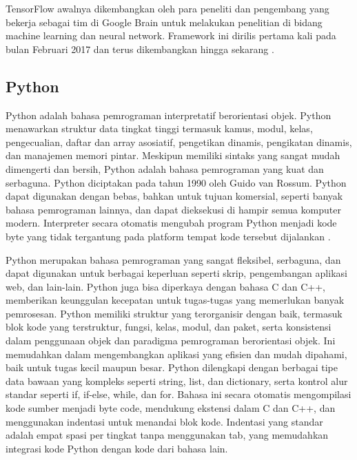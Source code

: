 TensorFlow awalnya dikembangkan oleh para peneliti dan pengembang yang bekerja sebagai tim di Google Brain untuk melakukan penelitian di bidang machine learning dan neural network. Framework ini dirilis pertama kali pada bulan Februari 2017 dan terus dikembangkan hingga sekarang \parencite{Developers}.

\subsection{Python}
Python adalah bahasa pemrograman interpretatif berorientasi objek. Python menawarkan struktur data tingkat tinggi termasuk kamus, modul, kelas, pengecualian, daftar dan array asosiatif, pengetikan dinamis, pengikatan dinamis, dan manajemen memori pintar. Meskipun memiliki sintaks yang sangat mudah dimengerti dan bersih, Python adalah bahasa pemrograman yang kuat dan serbaguna. Python diciptakan pada tahun 1990 oleh Guido van Rossum. Python dapat digunakan dengan bebas, bahkan untuk tujuan komersial, seperti banyak bahasa pemrograman lainnya, dan dapat dieksekusi di hampir semua komputer modern. Interpreter secara otomatis mengubah program Python menjadi kode byte yang tidak tergantung pada platform tempat kode tersebut dijalankan \parencite{Sanner1999Python}.

Python merupakan bahasa pemrograman yang sangat fleksibel, serbaguna, dan dapat digunakan untuk berbagai keperluan seperti skrip, pengembangan aplikasi web, dan lain-lain. Python juga bisa diperkaya dengan bahasa C dan C++, memberikan keunggulan kecepatan untuk tugas-tugas yang memerlukan banyak pemrosesan. Python memiliki struktur yang terorganisir dengan baik, termasuk blok kode yang terstruktur, fungsi, kelas, modul, dan paket, serta konsistensi dalam penggunaan objek dan paradigma pemrograman berorientasi objek. Ini memudahkan dalam mengembangkan aplikasi yang efisien dan mudah dipahami, baik untuk tugas kecil maupun besar. Python dilengkapi dengan berbagai tipe data bawaan yang kompleks seperti string, list, dan dictionary, serta kontrol alur standar seperti if, if-else, while, dan for. Bahasa ini secara otomatis mengompilasi kode sumber menjadi byte code, mendukung ekstensi dalam C dan C++, dan menggunakan indentasi untuk menandai blok kode. Indentasi yang standar adalah empat spasi per tingkat tanpa menggunakan tab, yang memudahkan integrasi kode Python dengan kode dari bahasa lain.


